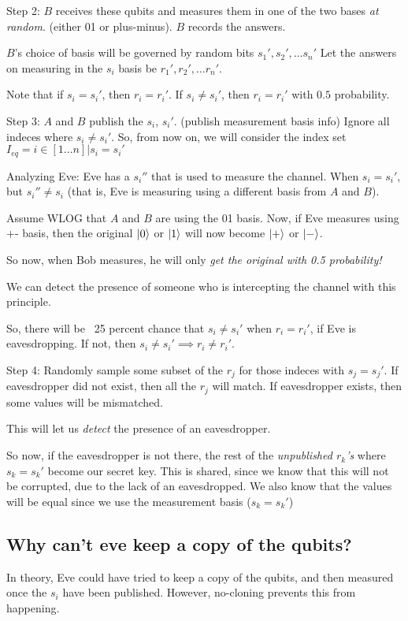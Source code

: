 Step 2: $B$ receives these qubits and measures them in one of the two bases
\textit{at random}. (either 01 or plus-minus). $B$ records the answers.

$B$'s choice of basis will be governed by random bits $s_1', s_2', \dots s_n'$
Let the answers on measuring in the $s_i$ basis be $r_1', r_2', \dots r_n'$. 


Note that if $s_i = s_i'$, then $r_i = r_i'$. If $s_i \neq s_i'$, then
$r_i = r_i'$ with $0.5$ probability.



Step 3: $A$ and $B$ publish the $s_i$, $s_i'$. (publish measurement basis info)
Ignore all indeces where $s_i \neq s_i'$. So, from now on, we will consider
the index set $I_{eq} = { i \in [1\dots n] \vert  s_i = s_i' }$

Analyzing Eve: Eve has a $s_i''$ that is used to measure the channel.
When $s_i = s_i'$, but $s_i'' \neq s_i$ (that is, Eve is measuring using a 
different basis from $A$ and $B$).

Assume WLOG that $A$ and $B$ are using the 01 basis. Now, if Eve measures
using +- basis, then the original $\ket{0}$ or $\ket{1}$ will now become
$\ket{+}$ or $\ket{-}$.

So now, when Bob measures, he will only \textit{get the original with 0.5 probability!}

We can detect the presence of someone who is intercepting the channel
with this principle.


So, there will be ~25 percent chance that $s_i \neq s_i'$ when $r_i = r_i'$, if
Eve is eavesdropping. If not, then $s_i \neq s_i' \implies r_i \neq r_i'$.

Step 4: Randomly sample some subset of the $r_j$ for those indeces with $s_j = s_j'$.
If eavesdropper did not exist, then all the $r_j$  will match. If eavesdropper
exists, then some values will be mismatched.

This will let us \textit{detect} the presence of an eavesdropper.

So now, if the eavesdropper is not there, the rest of the
\textit{unpublished $r_k$'s} where $s_k = s_k'$ become
our secret key. This is shared, since we know that this will not
be corrupted, due to the lack of an eavesdropped. We also know that the
values will be equal since we use the measurement basis ($s_k = s_k'$)


\subsection{Why can't eve keep a copy of the qubits?}
In theory, Eve could have tried to keep a copy of the qubits, and then measured
once the $s_i$ have been published. However, no-cloning prevents this from happening.

